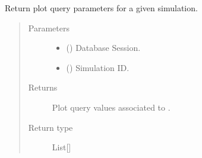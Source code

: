 \documentclass[a4paper,landscape,10pt,english]{sphinxmanual}
\begin{document}

\begin{fulllineitems}
\label{\detokenize{code_docs/simulation_API.model:simulation_API.model.crud._get_plot_query_values}}
Return plot query parameters for a given simulation.
\begin{quote}\begin{description}
\item[{Parameters}] \leavevmode\begin{itemize}
\item {} 
 () \textendash{} Database Session.

\item {} 
 () \textendash{} Simulation ID.

\end{itemize}

\item[{Returns}] \leavevmode
Plot query values associated to .

\item[{Return type}] \leavevmode
List{[}{\hyperref[\detokenize{code_docs/simulation_API.controller:simulation_API.controller.schemas.PlotQueryValues}]{}}{]}

\end{description}\end{quote}

\end{fulllineitems}

\end{document}
